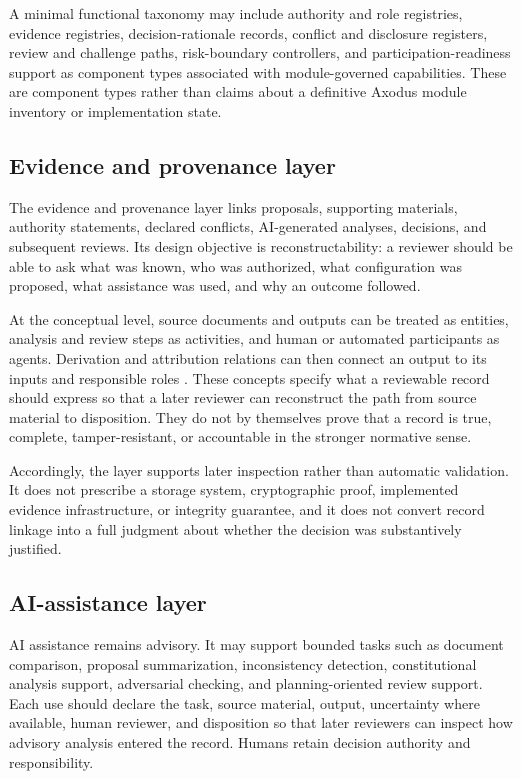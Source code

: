 \documentclass[11pt]{article}
\begin{document}
A minimal functional taxonomy may include authority and role registries,
evidence registries, decision-rationale records, conflict and disclosure
registers, review and challenge paths, risk-boundary controllers, and
participation-readiness support as component types associated with
module-governed capabilities. These are component types rather than claims
about a definitive Axodus module inventory or implementation state.

\subsection{Evidence and provenance layer}

The evidence and provenance layer links proposals, supporting materials,
authority statements, declared conflicts, AI-generated analyses, decisions,
and subsequent reviews. Its design objective is reconstructability: a
reviewer should be able to ask what was known, who was authorized, what
configuration was proposed, what assistance was used, and why an outcome
followed.

At the conceptual level, source documents and outputs can be treated as
entities, analysis and review steps as activities, and human or automated
participants as agents. Derivation and attribution relations can then connect
an output to its inputs and responsible roles \citep{w3c2013provdm}. These
concepts specify what a reviewable record should express so that a later
reviewer can reconstruct the path from source material to disposition. They
do not by themselves prove that a record is true, complete, tamper-resistant,
or accountable in the stronger normative sense.

Accordingly, the layer supports later inspection rather than automatic
validation. It does not prescribe a storage system, cryptographic proof,
implemented evidence infrastructure, or integrity guarantee, and it does not
convert record linkage into a full judgment about whether the decision was
substantively justified.

\subsection{AI-assistance layer}

AI assistance remains advisory. It may support bounded tasks such as document
comparison, proposal summarization, inconsistency detection, constitutional
analysis support, adversarial checking, and planning-oriented review support.
Each use should declare the task, source material, output, uncertainty where
available, human reviewer, and disposition so that later reviewers can
inspect how advisory analysis entered the record. Humans retain decision
authority and responsibility.
\end{document}
